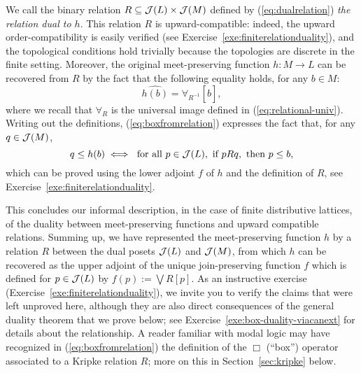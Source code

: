 We call the binary relation $R \subseteq \mathcal{J}(L) \times \mathcal{J}(M)$ defined by (\ref{eq:dualrelation}) \emph{the relation dual to $h$}. This relation $R$ is upward-compatible: indeed, the upward order-compatibility is easily verified (see Exercise~\ref{exe:finiterelationduality}), and the topological conditions hold trivially because the topologies are discrete in the finite setting. Moreover, the original meet-preserving function $h \colon M \to L$ can be recovered from $R$ by the fact that the following equality holds, for any $b \in M$: 
\begin{equation}\label{eq:boxfromrelation}
	\widehat{h(b)} = \forall_{R^{-1}}[\widehat{b}],
\end{equation}
where we recall that $\forall_{R}$ is the universal image defined in (\ref{eq:relational-univ}).
Writing out the definitions, (\ref{eq:boxfromrelation}) expresses the  fact that, for any $q \in \mathcal{J}(M)$, 
\[ q \leq h(b) \iff \text{ for all } p \in \mathcal{J}(L), \text{ if } p {R} q, \text{ then } p \leq b,\]
which can be proved using the lower adjoint $f$ of $h$ and the definition of $R$, see Exercise~\ref{exe:finiterelationduality}. 

This concludes our informal description, in the case of finite distributive lattices, of the duality between meet-preserving functions and upward compatible relations. Summing up, we have represented the meet-preserving function $h$ by a relation $R$ between the dual posets $\mathcal{J}(L)$ and $\mathcal{J}(M)$, from which $h$ can be recovered as the upper adjoint of the unique join-preserving function $f$ which is defined for $p \in \mathcal{J}(L)$ by $f(p) := \bigvee R[p]$. As an instructive exercise (Exercise~\ref{exe:finiterelationduality}), we invite you to verify the claims that were left unproved here, although they are also direct consequences of  the general duality theorem that we prove below; see Exercise~\ref{exe:box-duality-viacanext} for details about the relationship. A reader familiar with modal logic may have recognized in (\ref{eq:boxfromrelation}) the definition of the $\Box$ (``box'') operator associated to a Kripke relation $R$; more on this in Section~\ref{sec:kripke} below. 

